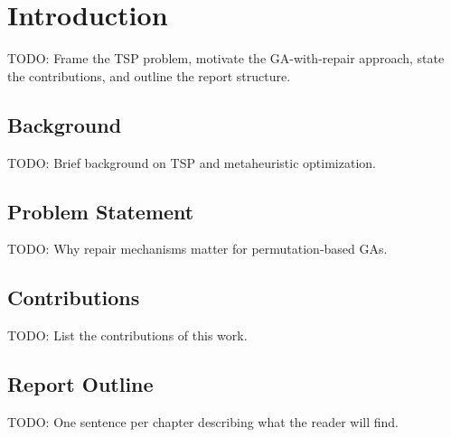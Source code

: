 \chapter{Introduction}
\label{Chapter1}

TODO: Frame the TSP problem, motivate the GA-with-repair approach, state the contributions, and outline the report structure.

\section{Background}
\label{Sec:Background}
TODO: Brief background on TSP and metaheuristic optimization.

\section{Problem Statement}
\label{Sec:ProblemStatement}
TODO: Why repair mechanisms matter for permutation-based GAs.

\section{Contributions}
\label{Sec:Contributions}
TODO: List the contributions of this work.

\section{Report Outline}
\label{Sec:ReportOutline}
TODO: One sentence per chapter describing what the reader will find.
